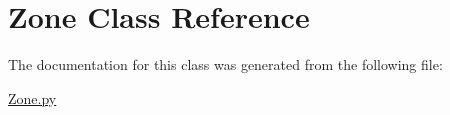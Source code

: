 \hypertarget{class_zone}{
\section{Zone Class Reference}
\label{class_zone}
}


The documentation for this class was generated from the following file:\begin{DoxyCompactItemize}
\item 
\hyperlink{_zone_8py}{Zone.py}\end{DoxyCompactItemize}
